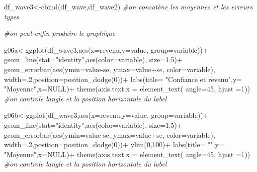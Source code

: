 \documentclass[
]{book}
\newenvironment{Shaded}{\begin{snugshade}}{\end{snugshade}}
\newcommand{\AttributeTok}[1]{\textcolor[rgb]{0.77,0.63,0.00}{#1}}
\newcommand{\CommentTok}[1]{\textcolor[rgb]{0.56,0.35,0.01}{\textit{#1}}}
\newcommand{\ConstantTok}[1]{\textcolor[rgb]{0.00,0.00,0.00}{#1}}
\newcommand{\DecValTok}[1]{\textcolor[rgb]{0.00,0.00,0.81}{#1}}
\newcommand{\FloatTok}[1]{\textcolor[rgb]{0.00,0.00,0.81}{#1}}
\newcommand{\FunctionTok}[1]{\textcolor[rgb]{0.00,0.00,0.00}{#1}}
\newcommand{\NormalTok}[1]{#1}
\newcommand{\OtherTok}[1]{\textcolor[rgb]{0.56,0.35,0.01}{#1}}
\newcommand{\SpecialCharTok}[1]{\textcolor[rgb]{0.00,0.00,0.00}{#1}}
\newcommand{\StringTok}[1]{\textcolor[rgb]{0.31,0.60,0.02}{#1}}
\begin{document}
\begin{Shaded}
\begin{Highlighting}[]
\NormalTok{df\_wave3}\OtherTok{\textless{}{-}}\FunctionTok{cbind}\NormalTok{(df\_wave,df\_wave2) }\CommentTok{\#on concatène les moyennes et les erreurs types}

\CommentTok{\#on peut enfin produire le graphique}

\NormalTok{g06a}\OtherTok{\textless{}{-}}\FunctionTok{ggplot}\NormalTok{(df\_wave3,}\FunctionTok{aes}\NormalTok{(}\AttributeTok{x=}\NormalTok{revenu,}\AttributeTok{y=}\NormalTok{value, }\AttributeTok{group=}\NormalTok{variable))}\SpecialCharTok{+}
  \FunctionTok{geom\_line}\NormalTok{(}\AttributeTok{stat=}\StringTok{"identity"}\NormalTok{,}\FunctionTok{aes}\NormalTok{(}\AttributeTok{color=}\NormalTok{variable), }\AttributeTok{size=}\FloatTok{1.5}\NormalTok{)}\SpecialCharTok{+} 
  \FunctionTok{geom\_errorbar}\NormalTok{(}\FunctionTok{aes}\NormalTok{(}\AttributeTok{ymin=}\NormalTok{value}\SpecialCharTok{{-}}\NormalTok{se, }\AttributeTok{ymax=}\NormalTok{value}\SpecialCharTok{+}\NormalTok{se, }\AttributeTok{color=}\NormalTok{variable), }\AttributeTok{width=}\NormalTok{.}\DecValTok{2}\NormalTok{,}\AttributeTok{position=}\FunctionTok{position\_dodge}\NormalTok{(}\DecValTok{0}\NormalTok{))}\SpecialCharTok{+}
  \FunctionTok{labs}\NormalTok{(}\AttributeTok{title=} \StringTok{"Confiance et revenu"}\NormalTok{,}\AttributeTok{y=} \StringTok{"Moyenne"}\NormalTok{,}\AttributeTok{x=}\ConstantTok{NULL}\NormalTok{)}\SpecialCharTok{+}
  \FunctionTok{theme}\NormalTok{(}\AttributeTok{axis.text.x =} \FunctionTok{element\_text}\NormalTok{( }\AttributeTok{angle=}\DecValTok{45}\NormalTok{, }\AttributeTok{hjust =}\DecValTok{1}\NormalTok{)) }\CommentTok{\#on controle l\textquotesingle{}angle et la position horizontale du label}

  
\NormalTok{g06b}\OtherTok{\textless{}{-}}\FunctionTok{ggplot}\NormalTok{(df\_wave3,}\FunctionTok{aes}\NormalTok{(}\AttributeTok{x=}\NormalTok{revenu,}\AttributeTok{y=}\NormalTok{value, }\AttributeTok{group=}\NormalTok{variable))}\SpecialCharTok{+}
  \FunctionTok{geom\_line}\NormalTok{(}\AttributeTok{stat=}\StringTok{"identity"}\NormalTok{,}\FunctionTok{aes}\NormalTok{(}\AttributeTok{color=}\NormalTok{variable), }\AttributeTok{size=}\FloatTok{1.5}\NormalTok{)}\SpecialCharTok{+} 
  \FunctionTok{geom\_errorbar}\NormalTok{(}\FunctionTok{aes}\NormalTok{(}\AttributeTok{ymin=}\NormalTok{value}\SpecialCharTok{{-}}\NormalTok{se, }\AttributeTok{ymax=}\NormalTok{value}\SpecialCharTok{+}\NormalTok{se, }\AttributeTok{color=}\NormalTok{variable), }\AttributeTok{width=}\NormalTok{.}\DecValTok{2}\NormalTok{,}\AttributeTok{position=}\FunctionTok{position\_dodge}\NormalTok{(}\DecValTok{0}\NormalTok{))}\SpecialCharTok{+}
  \FunctionTok{ylim}\NormalTok{(}\DecValTok{0}\NormalTok{,}\DecValTok{100}\NormalTok{)}\SpecialCharTok{+}
  \FunctionTok{labs}\NormalTok{(}\AttributeTok{title=} \StringTok{""}\NormalTok{,}\AttributeTok{y=} \StringTok{"Moyenne"}\NormalTok{,}\AttributeTok{x=}\ConstantTok{NULL}\NormalTok{)}\SpecialCharTok{+}
  \FunctionTok{theme}\NormalTok{(}\AttributeTok{axis.text.x =} \FunctionTok{element\_text}\NormalTok{( }\AttributeTok{angle=}\DecValTok{45}\NormalTok{, }\AttributeTok{hjust =}\DecValTok{1}\NormalTok{)) }\CommentTok{\#on controle l\textquotesingle{}angle et la position horizontale du label}


\end{Highlighting}
\end{Shaded}
\end{document}
